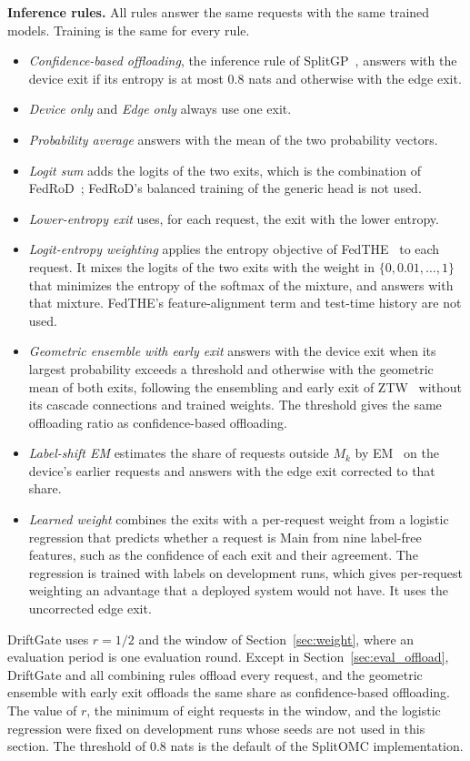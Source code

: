 \textbf{Inference rules.} All rules answer the same requests with the same trained models. Training is the same for every rule.
\begin{itemize}
\item \emph{Confidence-based offloading}, the inference rule of SplitGP~\cite{han2023splitgp}, answers with the device exit if its entropy is at most 0.8 nats and otherwise with the edge exit.
\item \emph{Device only} and \emph{Edge only} always use one exit.
\item \emph{Probability average} answers with the mean of the two probability vectors.
\item \emph{Logit sum} adds the logits of the two exits, which is the combination of FedRoD~\cite{chen2022fedrod}; FedRoD's balanced training of the generic head is not used.
\item \emph{Lower-entropy exit} uses, for each request, the exit with the lower entropy.
\item \emph{Logit-entropy weighting} applies the entropy objective of FedTHE~\cite{jiang2023fedthe} to each request. It mixes the logits of the two exits with the weight in $\{0,0.01,\dots,1\}$ that minimizes the entropy of the softmax of the mixture, and answers with that mixture. FedTHE's feature-alignment term and test-time history are not used.
\item \emph{Geometric ensemble with early exit} answers with the device exit when its largest probability exceeds a threshold and otherwise with the geometric mean of both exits, following the ensembling and early exit of ZTW~\cite{wolczyk2021ztw} without its cascade connections and trained weights. The threshold gives the same offloading ratio as confidence-based offloading.
\item \emph{Label-shift EM} estimates the share of requests outside $M_k$ by EM~\cite{saerens2002adjusting} on the device's earlier requests and answers with the edge exit corrected to that share.
\item \emph{Learned weight} combines the exits with a per-request weight from a logistic regression that predicts whether a request is Main from nine label-free features, such as the confidence of each exit and their agreement. The regression is trained with labels on development runs, which gives per-request weighting an advantage that a deployed system would not have. It uses the uncorrected edge exit.
\end{itemize}
DriftGate uses $r=1/2$ and the window of Section~\ref{sec:weight}, where an evaluation period is one evaluation round. Except in Section~\ref{sec:eval_offload}, DriftGate and all combining rules offload every request, and the geometric ensemble with early exit offloads the same share as confidence-based offloading. The value of $r$, the minimum of eight requests in the window, and the logistic regression were fixed on development runs whose seeds are not used in this section. The threshold of 0.8 nats is the default of the SplitOMC implementation.

